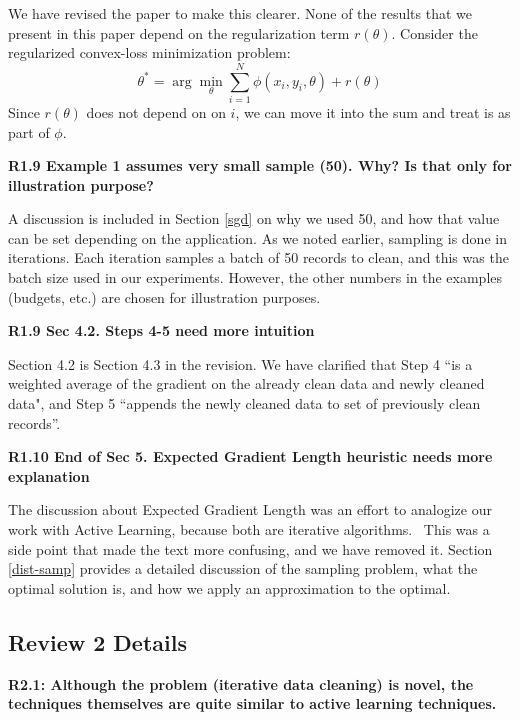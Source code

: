 \noindent We have revised the paper to make this clearer.
None of the results that we present in this paper depend on the regularization term $r(\theta)$.
Consider the regularized convex-loss minimization problem:
\[
 \theta^{*}=\arg\min_{\theta}\sum_{i=1}^{N}\phi(x_{i},y_{i},\theta) + r(\theta)
\]
Since $r(\theta)$ does not depend on on $i$, we can move it into the sum and treat is as part of $\phi$.

\vspace{0.5em}

\noindent\textbf{R1.9 Example 1 assumes very small sample (50). Why? Is that only for illustration purpose?}

\noindent  A discussion is included in Section \ref{sgd} on why we used 50, and how that value can be set depending on the application. As we noted earlier, sampling is done in iterations. Each iteration samples a batch of 50 records to clean, and this was the batch size used in our experiments. However, the other numbers in the examples (budgets, etc.) are chosen for illustration purposes. 

\vspace{0.5em}

\noindent\textbf{R1.9 Sec 4.2. Steps 4-5 need more intuition}

\noindent  Section 4.2 is Section 4.3 in the revision. We have clarified that Step 4 ``is a weighted average of the gradient on the already clean data and newly cleaned data", and Step 5 ``appends the newly cleaned data to set of previously clean records''.

\vspace{0.5em}

\noindent\textbf{R1.10 End of Sec 5. Expected Gradient Length heuristic needs more explanation}

\noindent  The discussion about Expected Gradient Length was an effort to analogize our work with Active Learning, because both are iterative algorithms.  This was a side point that made the text more confusing, and we have removed it.
Section \ref{dist-samp} provides a detailed discussion of the sampling problem, what the optimal solution is, and how we apply an approximation to the optimal.

\subsection*{Review 2 Details}

\noindent\textbf{R2.1: Although the problem (iterative data cleaning) is novel, the techniques themselves are quite similar to active learning techniques.}


